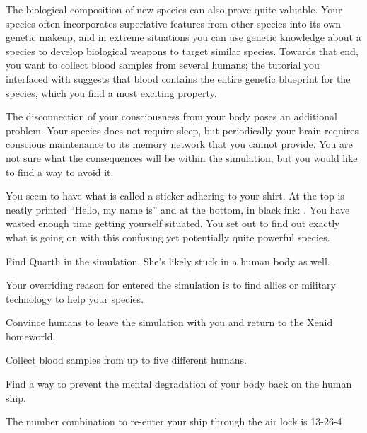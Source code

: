 \documentclass[char]{guildcamp1}
\begin{document}
The biological composition of new species can also prove quite valuable. Your species often incorporates superlative features from other species into its own genetic makeup, and in extreme situations you can use genetic knowledge about a species to develop biological weapons to target similar species. Towards that end, you want to collect blood samples from several humans; the tutorial you interfaced with suggests that blood contains the entire genetic blueprint for the species, which you find a most exciting property.

The disconnection of your consciousness from your body poses an additional problem. Your species does not require sleep, but periodically your brain requires conscious maintenance to its memory network that you cannot provide. You are not sure what the consequences will be within the simulation, but you would like to find a way to avoid it.

You seem to have what is called a sticker adhering to your shirt. At the top is neatly printed ``Hello, my name is'' and at the bottom, in black ink: \cActive{\intro}. You have wasted enough time getting yourself situated. You set out to find out exactly what is going on with this confusing yet potentially quite powerful species.

\begin{itemz}[Goals]
  \item Find Quarth in the simulation. She's likely stuck in a human body as well.
  \item Your overriding reason for entered the simulation is to find allies or military technology to help your species.
  \item Convince humans to leave the simulation with you and return to the Xenid homeworld.
  \item Collect blood samples from up to five different humans.
  \item Find a way to prevent the mental degradation of your body back on the human ship.
\end{itemz}

\begin{itemz}[Notes]
  \item The number combination to re-enter your ship through the air lock is 13-26-4
\end{itemz}

\end{document}
